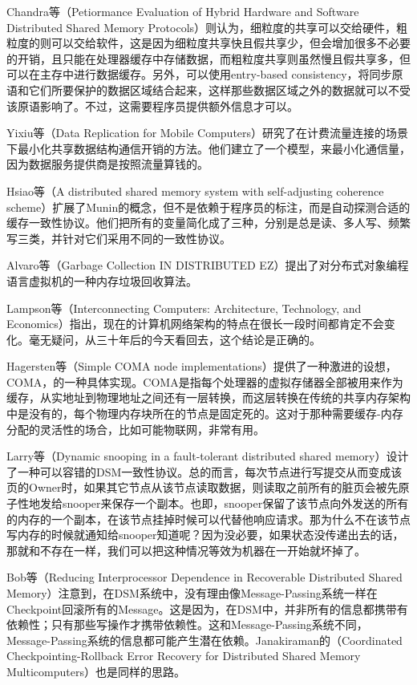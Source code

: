 \documentclass[a4paper,twoside]{scrbook}
\begin{document}
Chandra等（Petiormance Evaluation of Hybrid Hardware and Software Distributed Shared Memory Protocols）则认为，细粒度的共享可以交给硬件，粗粒度的则可以交给软件，这是因为细粒度共享快且假共享少，但会增加很多不必要的开销，且只能在处理器缓存中存储数据，而粗粒度共享则虽然慢且假共享多，但可以在主存中进行数据缓存。另外，可以使用entry-based consistency，将同步原语和它们所要保护的数据区域结合起来，这样那些数据区域之外的数据就可以不受该原语影响了。不过，这需要程序员提供额外信息才可以。

Yixiu等（Data Replication for Mobile Computers）研究了在计费流量连接的场景下最小化共享数据结构通信开销的方法。他们建立了一个模型，来最小化通信量，因为数据服务提供商是按照流量算钱的。

Hsiao等（A distributed shared memory system with self-adjusting coherence scheme）扩展了Munin的概念，但不是依赖于程序员的标注，而是自动探测合适的缓存一致性协议。他们把所有的变量简化成了三种，分别是总是读、多人写、频繁写三类，并针对它们采用不同的一致性协议。

Alvaro等（Garbage Collection IN DISTRIBUTED EZ）提出了对分布式对象编程语言虚拟机的一种内存垃圾回收算法。

Lampson等（Interconnecting Computers: Architecture, Technology, and Economics）指出，现在的计算机网络架构的特点在很长一段时间都肯定不会变化。毫无疑问，从三十年后的今天看回去，这个结论是正确的。

Hagersten等（Simple COMA node implementations）提供了一种激进的设想，COMA，的一种具体实现。COMA是指每个处理器的虚拟存储器全部被用来作为缓存，从实地址到物理地址之间还有一层转换，而这层转换在传统的共享内存架构中是没有的，每个物理内存块所在的节点是固定死的。这对于那种需要缓存-内存分配的灵活性的场合，比如可能物联网，非常有用。

Larry等（Dynamic snooping in a fault-tolerant distributed shared memory）设计了一种可以容错的DSM一致性协议。总的而言，每次节点进行写提交从而变成该页的Owner时，如果其它节点从该节点读取数据，则读取之前所有的脏页会被先原子性地发给snooper来保存一个副本。也即，snooper保留了该节点向外发送的所有的内存的一个副本，在该节点挂掉时候可以代替他响应请求。那为什么不在该节点写内存的时候就通知给snooper知道呢？因为没必要，如果状态没传递出去的话，那就和不存在一样，我们可以把这种情况等效为机器在一开始就坏掉了。

Bob等（Reducing Interprocessor Dependence in Recoverable Distributed Shared Memory）注意到，在DSM系统中，没有理由像Message-Passing系统一样在Checkpoint回滚所有的Message。这是因为，在DSM中，并非所有的信息都携带有依赖性；只有那些写操作才携带依赖性。这和Message-Passing系统不同，Message-Passing系统的信息都可能产生潜在依赖。Janakiraman的（Coordinated Checkpointing-Rollback Error Recovery for Distributed Shared Memory Multicomputers）也是同样的思路。
\end{document}
